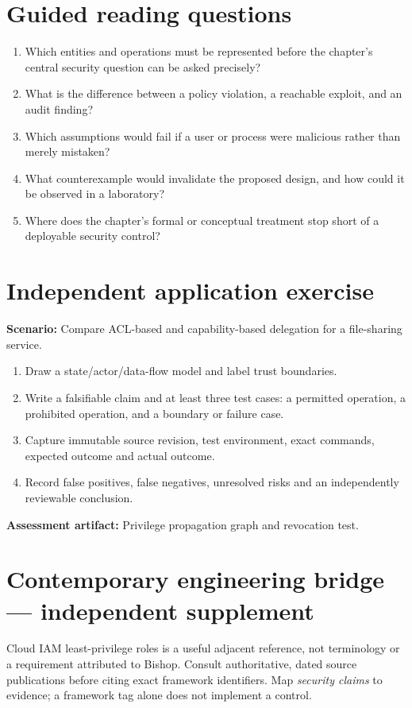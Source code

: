 \documentclass[10pt,letterpaper]{article}
\begin{document}
\section{Guided reading questions}
\begin{enumerate}
\item Which entities and operations must be represented before the chapter's central security question can be asked precisely?
\item What is the difference between a policy violation, a reachable exploit, and an audit finding?
\item Which assumptions would fail if a user or process were malicious rather than merely mistaken?
\item What counterexample would invalidate the proposed design, and how could it be observed in a laboratory?
\item Where does the chapter's formal or conceptual treatment stop short of a deployable security control?
\end{enumerate}
\section{Independent application exercise}
\textbf{Scenario:} Compare ACL-based and capability-based delegation for a file-sharing service.
\begin{enumerate}
\item Draw a state/actor/data-flow model and label trust boundaries.
\item Write a falsifiable claim and at least three test cases: a permitted operation, a prohibited operation, and a boundary or failure case.
\item Capture immutable source revision, test environment, exact commands, expected outcome and actual outcome.
\item Record false positives, false negatives, unresolved risks and an independently reviewable conclusion.
\end{enumerate}
\textbf{Assessment artifact:} Privilege propagation graph and revocation test.
\section{Contemporary engineering bridge --- independent supplement}
Cloud IAM least-privilege roles is a useful adjacent reference, not terminology or a requirement attributed to Bishop. Consult authoritative, dated source publications before citing exact framework identifiers. Map \emph{security claims} to evidence; a framework tag alone does not implement a control.
\end{document}
